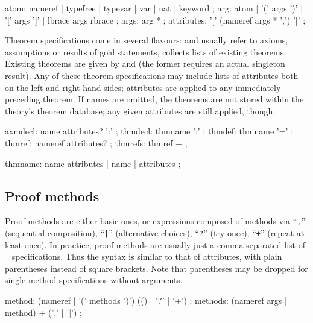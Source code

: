 \begin{rail}
  atom: nameref | typefree | typevar | var | nat | keyword
  ;
  arg: atom | '(' args ')' | '[' args ']' | lbrace args rbrace
  ;
  args: arg *
  ;
  attributes: '[' (nameref args * ',') ']'
  ;
\end{rail}

Theorem specifications come in several flavours:  and
 usually refer to axioms, assumptions or results of goal
statements,  collects lists of existing theorems.
Existing theorems are given by  and 
(the former requires an actual singleton result).  Any of these theorem
specifications may include lists of attributes both on the left and right hand
sides; attributes are applied to any immediately preceding theorem.  If names
are omitted, the theorems are not stored within the theory's theorem database;
any given attributes are still applied, though.

\begin{rail}
  axmdecl: name attributes? ':'
  ;
  thmdecl: thmname ':'
  ;
  thmdef: thmname '='
  ;
  thmref: nameref attributes?
  ;
  thmrefs: thmref +
  ;

  thmname: name attributes | name | attributes
  ;
\end{rail}


\subsection{Proof methods}\label{sec:syn-meth}

Proof methods are either basic ones, or expressions composed of methods via
``\texttt{,}'' (sequential composition), ``\texttt{|}'' (alternative choices),
``\texttt{?}'' (try once), ``\texttt{+}'' (repeat at least once).  In
practice, proof methods are usually just a comma separated list of
~ specifications.  Thus the syntax is
similar to that of attributes, with plain parentheses instead of square
brackets.  Note that parentheses may be dropped for single method
specifications without arguments.

\begin{rail}
  method: (nameref | '(' methods ')') (() | '?' | '+')
  ;
  methods: (nameref args | method) + (',' | '|')
  ;
\end{rail}


